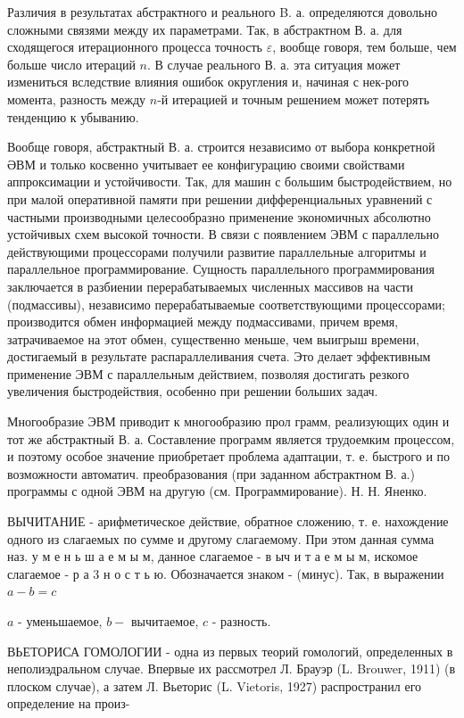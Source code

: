 \documentclass[10pt]{article}
\begin{document}
Различия в результатах абстрактного и реального B. а. определяются довольно сложными связями между их параметрами. Так, в абстрактном В. а. для сходящегося итерационного процесса точность $\varepsilon$, вообще говоря, тем больше, чем больше число итераций $n$. В случае реального В. а. эта ситуация может измениться вследствие влияния ошибок округления и, начиная с нек-рого момента, разность между $n$-й итерацией и точным решением может потерять тенденцию к убыванию.



Вообще говоря, абстрактный В. а. строится независимо от выбора конкретной ӘВМ и только косвенно учитывает ее конфигурацию своими свойствами аппроксимации и устойчивости. Так, для машин с большим быстродействием, но при малой оперативной памяти при решении дифференциальных уравнений с частными производными целесообразно применение экономичных абсолютно устойчивых схем высокой точности. В связи с появлением ЭВМ с параллельно действующими процессорами получили развитие параллельные алгоритмы и параллельное программирование. Сущность параллельного программирования заключается в разбиении перерабатываемых численных массивов на части (подмассивы), независимо перерабатываемые соответствующими процессорами; производится обмен информацией между подмассивами, причем время, затрачиваемое на этот обмен, существенно меньше, чем выигрыш времени, достигаемый в результате распараллеливания счета. Это делает эффективным применение ЭВМ с параллельным действием, позволяя достигать резкого увеличения быстродействия, особенно при решении больших задач.



Многообразие ЭВМ приводит к многообразию прол грамм, реализующих один и тот же абстрактный В. а. Составление программ является трудоемким процессом, и поэтому особое значение приобретает проблема адаптации, т. е. быстрого и по возможности автоматич. преобразования (при заданном абстрактном В. а.) программы с одной ЭВМ на другую (см. Программирование). Н. Н. Яненко.



ВЫЧИТАНИЕ - арифметическое действие, обратное сложению, т. е. нахождение одного из слагаемых по сумме и другому слагаемому. При этом данная сумма наз. у м е н ь ш а е м ы м, данное слагаемое - в ыч и т а е м ы м, искомое слагаемое - р а 3 н о с т ь ю. Обозначается знаком - (минус). Так, в выражении $a-b=c$



$a$ - уменьшаемое, $b-$ вычитаемое, $c$ - разность.



ВЬЕТОРИСА ГОМОЛОГИИ - одна из первых теорий гомологий, определенных в неполиэдральном случае. Впервые их рассмотрел Л. Брауэр (L. Brouwer, 1911) (в плоском случае), а затем Л. Вьеторис (L. Vietoris, 1927) распространил его определение на произ-
\end{document}
